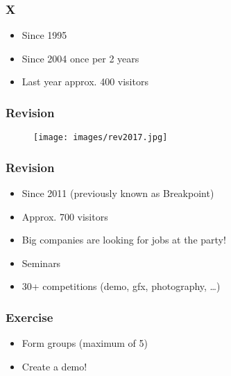 \documentclass[aspectratio=43]{uva-inf-presentation}
\begin{document}

\begin{frame}
\frametitle{X}

\begin{itemize}
\item Since 1995
\item Since 2004 once per 2 years
\item Last year approx. 400 visitors
\end{itemize}

\end{frame}


\begin{frame}
\frametitle{Revision}

\begin{figure}
\texttt{[image: images/rev2017.jpg]}
\end{figure}

\end{frame}


\begin{frame}
\frametitle{Revision}

\begin{itemize}
\item Since 2011 (previously known as Breakpoint)
\item Approx. 700 visitors
\item Big companies are looking for jobs at the party!
\item Seminars
\item 30+ competitions (demo, gfx, photography, \dots)
\end{itemize}

\end{frame}


\begin{frame}
\frametitle{Exercise}

\begin{itemize}
\item Form groups (maximum of 5)
\item Create a demo!
\end{itemize}

\end{frame}

\end{document}
